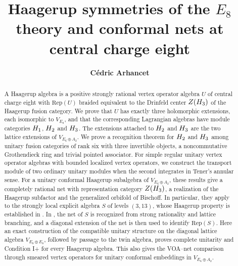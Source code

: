 \documentclass[leqno]{article}
\let\cal\relax
\newcommand{\cal}{\mathcal}
\numberwithin{equation}{section}
\begin{document}
\title{\bfseries{Haagerup symmetries of the $E_8$ theory and conformal nets at central charge eight}}
\date{}
\author{\bfseries{C\'edric Arhancet}}
\maketitle


\begin{abstract}
A Haagerup algebra is a positive strongly rational vertex operator algebra $U$ of central charge eight with $\mathrm{Rep}(U)$ braided equivalent to the Drinfeld center $Z(\cal H_3)$ of the Haagerup fusion category. We prove that $U$ has exactly three holomorphic extensions, each isomorphic to $V_{E_8}$, and that the corresponding Lagrangian algebras have module categories $\cal H_1$, $\cal H_2$ and $\cal H_3$. The extensions attached to $\cal H_2$ and $\cal H_3$ are the two lattice extensions of $V_{E_6 \oplus A_2}$. We prove a recognition theorem for $\cal H_2$ and $\cal H_3$ among unitary fusion categories of rank six with three invertible objects, a noncommutative Grothendieck ring and trivial pointed associator. For simple regular unitary vertex operator algebras with bounded localized vertex operators, we construct the transport module of two ordinary unitary modules when the second integrates in Tener's annular sense. For a unitary conformal Haagerup subalgebra of $V_{E_6 \oplus A_2}$, these results give a completely rational net with representation category $Z(\cal H_3)$, a realization of the Haagerup subfactor and the generalized orbifold of Bischoff. In particular, they apply to the strongly local explicit algebra $S$ of levels $(3,13)$, whose Haagerup property is established in \cite[Theorem 6.1]{ArhIII}. In \cite{ArhIII}, the net of $S$ is recognized from strong rationality and lattice branching, and a diagonal extension of the net is then used to identify $\mathrm{Rep}(S)$. Here an exact construction of the compatible unitary structure on the diagonal lattice algebra $V_{E_8 \oplus E_8}$, followed by passage to the twin algebra, proves complete unitarity and Condition I+ for every Haagerup algebra. This also gives the VOA--net comparison through smeared vertex operators for unitary conformal embeddings in $V_{E_6 \oplus A_2}$.
\end{abstract}

\end{document}
